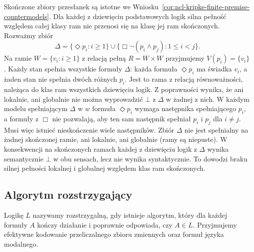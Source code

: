 \begin{przyklad}
\label{ex:ncl-kripke-no-finite-strong-completeness}
Skończone zbiory przesłanek są istotne
we Wniosku~\ref{cor:ncl-kripke-finite-premise-countermodels}.
Dla każdej z dziewięciu podstawowych logik
silna pełność względem całej klasy ram
nie przenosi się na klasę jej ram skończonych.
Rozważmy zbiór
\[
 \Delta=\{\Diamond p_i:i\geq1\}
 \cup\{\Box\neg(p_i\wedge p_j):1\leq i<j\}.
\]
Na ramie $W=\{v_i:i\geq1\}$ z relacją pełną
$R=W\times W$ przyjmujemy $V(p_i)=\{v_i\}$.
Każdy stan spełnia wszystkie formuły $\Delta$:
każda formuła $\Diamond p_i$ ma świadka $v_i$,
a żaden stan nie spełnia dwóch różnych $p_i$.
Jest to rama z relacją równoważności,
należąca do klas ram wszystkich dziewięciu
logik. Z poprawności wynika, że ani lokalnie,
ani globalnie nie można wyprowadzić $\bot$
z $\Delta$ w żadnej z nich.
W każdym modelu spełniającym $\Delta$ w $w$
formuła $\Diamond p_i$ wymaga następnika
spełniającego $p_i$, a formuły z $\Box$
nie pozwalają, aby ten sam następnik
spełniał $p_i$ i $p_j$ dla $i\ne j$.
Musi więc istnieć nieskończenie wiele
następników. Zbiór $\Delta$ nie jest
spełnialny na żadnej skończonej ramie,
ani lokalnie, ani globalnie (ramy są niepuste).
W konsekwencji na skończonych ramach
każdej z dziewięciu logik z $\Delta$
wynika semantycznie $\bot$ w obu sensach,
lecz nie wynika syntaktycznie. To dowodzi
braku silnej pełności lokalnej i globalnej
względem klas ram skończonych.
\end{przyklad}

\subsection{Algorytm rozstrzygający}

\begin{definicja}
\label{def:ncl-kripke-decidability}
Logikę $L$ nazywamy rozstrzygalną, gdy
istnieje algorytm, który dla każdej formuły
$A$ kończy działanie i poprawnie odpowiada,
czy $A\in L$.
Przyjmujemy efektywne kodowanie przeliczalnego
zbioru zmiennych oraz formuł języka modalnego.
\end{definicja}

